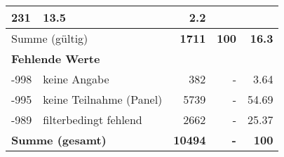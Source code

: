 \begin{longtable}{lXrrr}
       \num{231} &
       \num[round-mode=places,round-precision=2]{13.5} &
         \num[round-mode=places,round-precision=2]{2.2} \\
     \midrule
     \multicolumn{2}{l}{Summe (gültig)} &
       \textbf{\num{1711}} &
     \textbf{\num{100}} &
       \textbf{\num[round-mode=places,round-precision=2]{16.3}} \\
     \multicolumn{5}{l}{\textbf{Fehlende Werte}}\\
       -998 &
       keine Angabe &
         \num{382} &
        - &
         \num[round-mode=places,round-precision=2]{3.64} \\
       -995 &
       keine Teilnahme (Panel) &
         \num{5739} &
        - &
         \num[round-mode=places,round-precision=2]{54.69} \\
       -989 &
       filterbedingt fehlend &
         \num{2662} &
        - &
         \num[round-mode=places,round-precision=2]{25.37} \\
     \midrule
     \multicolumn{2}{l}{\textbf{Summe (gesamt)}} &
          \textbf{\num{10494}} &
        \textbf{-} &
        \textbf{\num{100}} \\
     \bottomrule
     \end{longtable}
     
